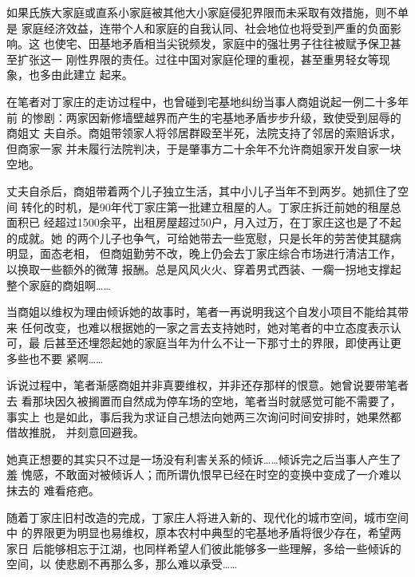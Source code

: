   如果氏族大家庭或直系小家庭被其他大小家庭侵犯界限而未采取有效措施，则不单是
  家庭经济效益，连带个人和家庭的自我认同、社会地位也将受到严重的负面影响。这
  也使宅、田基地矛盾相当尖锐频发，家庭中的强壮男子往往被赋予保卫甚至扩张这一
  刚性界限的责任。过往中国对家庭伦理的重视，甚至重男轻女等现象，也多由此建立
  起来。

  在笔者对丁家庄的走访过程中，也曾碰到宅基地纠纷当事人商姐说起一例二十多年前
  的惨剧：两家因新修墙壁越界而产生的宅基地矛盾步步升级，致使受到屈辱的商姐丈
  夫自杀。商姐带领家人将邻居群殴至半死，法院支持了邻居的索赔诉求，但商家一家
  并未履行法院判决，于是肇事方二十余年不允许商姐家开发自家一块空地。

  丈夫自杀后，商姐带着两个儿子独立生活，其中小儿子当年不到两岁。她抓住了空间
  转化的时机，是90年代丁家庄第一批建立租屋的人。丁家庄拆迁前她的租屋总面积已
  经超过1500余平，出租房屋超过50户，月入过万，在丁家庄这也是了不起的成就。她
  的两个儿子也争气，可给她带去一些宽慰，只是长年的劳苦使其腿病明显，面态老相，
  但商姐勤劳不改，晚上仍会去丁家庄综合市场进行清洁工作，以换取一些额外的微薄
  报酬。总是风风火火、穿着男式西装、一瘸一拐地支撑起整个家庭的商姐啊……

  当商姐以维权为理由倾诉她的故事时，笔者一再说明我这个自发小项目不能给其带来
  任何改变，也难以根据她的一家之言去支持她时，她对笔者的中立态度表示认可，最
  后甚至还埋怨起她的家庭当年为什么不让一下那寸土的界限，即使再让更多些也不要
  紧啊……

  诉说过程中，笔者渐感商姐并非真要维权，并非还存那样的恨意。她曾说要带笔者去
  看那块因久被搁置而自然成为停车场的空地，笔者当时就感觉可能不需要了，事实上
  也是如此，事后我为求证自己想法向她两三次询问时间安排时，她果然都借故推脱，
  并刻意回避我。

  她真正想要的其实只不过是一场没有利害关系的倾诉……倾诉完之后当事人产生了羞
  愧感，不敢面对被倾诉人；而所谓仇恨早已经在时空的变换中变成了一介难以抹去的
  难看疮疤。

  随着丁家庄旧村改造的完成，丁家庄人将进入新的、现代化的城市空间，城市空间中
  的界限更为明显也易维权，原本农村中典型的宅基地矛盾将很少存在，希望两家日
  后能够相忘于江湖，也同样希望人们彼此能够多一些理解，多给一些倾诉的空间，以
  使悲剧不再那么多，那么难以承受……






